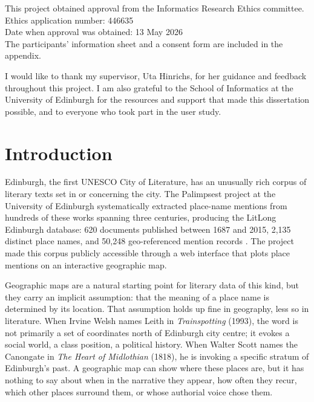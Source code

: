 \documentclass[logo,msc]{infthesis}
\begin{document}
\begin{preliminary}
\begin{ethics}
This project obtained approval from the Informatics Research Ethics committee.\\
Ethics application number: 446635\\
Date when approval was obtained: 13 May 2026\\
The participants' information sheet and a consent form are included in the appendix.\\
\standarddeclaration
\end{ethics}
 
\begin{acknowledgements}
I would like to thank my supervisor, Uta Hinrichs, for her guidance and feedback throughout this project. I am also grateful to the School of Informatics at the University of Edinburgh for the resources and support that made this dissertation possible, and to everyone who took part in the user study.
\end{acknowledgements}
 
\tableofcontents
\listoffigures
 
\end{preliminary}
 
 
\chapter{Introduction}
\label{chap:intro}

 
Edinburgh, the first UNESCO City of Literature, has an unusually rich corpus of literary texts set in or concerning the city. The Palimpsest project at the University of Edinburgh systematically extracted place-name mentions from hundreds of these works spanning three centuries, producing the LitLong Edinburgh database: 620 documents published between 1687 and 2015, 2,135 distinct place names, and 50,248 geo-referenced mention records \cite{anderson2016}. The project made this corpus publicly accessible through a web interface that plots place mentions on an interactive geographic map.
 
Geographic maps are a natural starting point for literary data of this kind, but they carry an implicit assumption: that the meaning of a place name is determined by its location. That assumption holds up fine in geography, less so in literature. When Irvine Welsh names Leith in \textit{Trainspotting} (1993), the word is not primarily a set of coordinates north of Edinburgh city centre; it evokes a social world, a class position, a political history. When Walter Scott names the Canongate in \textit{The Heart of Midlothian} (1818), he is invoking a specific stratum of Edinburgh's past. A geographic map can show where these places are, but it has nothing to say about when in the narrative they appear, how often they recur, which other places surround them, or whose authorial voice chose them.
\end{document}

